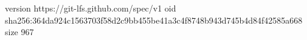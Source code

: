 version https://git-lfs.github.com/spec/v1
oid sha256:364da924c1563703f58d2c9bb455be41a3c4f8748b943d745b4d84f42585a668
size 967
